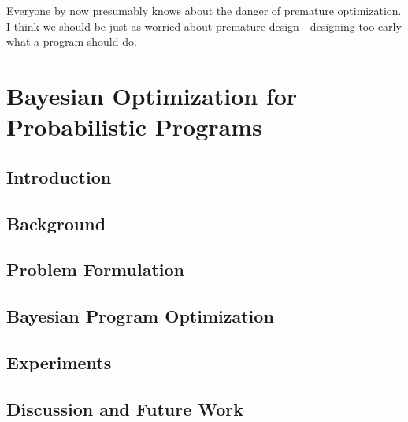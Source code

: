 
\begin{savequote}[8cm]
	Everyone by now presumably knows about the danger of premature optimization. 
	I think we should be just as worried about premature design - 
	designing too early what a program should do.
\end{savequote}

\chapter{Bayesian Optimization for Probabilistic Programs}
\label{chp:bopp}



\section{Introduction} 
\label{sec:IntroductionBOPP}



\section{Background}






\section{Problem Formulation}
\label{sec:problem}



\section{Bayesian Program Optimization}
\label{sec:bopp}



\section{Experiments}



\section{Discussion and Future Work}
\label{sec:disc}

